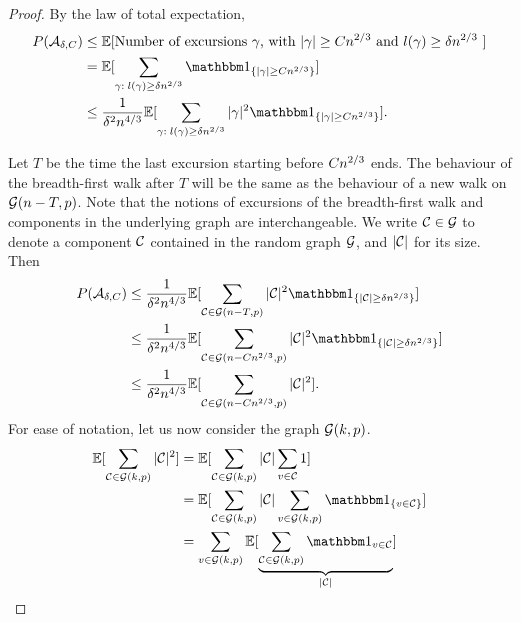\begin{proof}
	By the law of total expectation,
	\begin{align*}
	P(\ExcursionEvent) 
	&\leq \Exp{ \text{Number of excursions $\gamma$, with $|\gamma| \geq C\n{2}{3}$ and $l(\gamma) \geq \delta\n{2}{3}$ } } \\
	&= \Exp{ \sum_{\gamma: \; l(\gamma) \geq \delta\n{2}{3}} \Ind{\{|\gamma| \geq C\n{2}{3} \} } } \\
	&\leq \frac{1}{\delta^2\n{4}{3}} \Exp{ \sum_{\gamma: \; l(\gamma) \geq \delta\n{2}{3}}  |\gamma|^2 \Ind{\{|\gamma| \geq C\n{2}{3} \} }}.
	\end{align*}
	
	Let $T$ be the time the last excursion starting before $Cn^{2 / 3}$ ends.
	The behaviour of the breadth-first walk after $T$ will be the same as the behaviour of a new walk on $\mathcal{G}(n-T,p)$.
	Note that the notions of excursions of the breadth-first walk and components in the underlying graph are interchangeable.
	We write $\mathcal{C} \in \mathcal{G}$ to denote a component $\mathcal{C}$ contained in the random graph $\mathcal{G}$,
	and $|\mathcal{C}|$ for its size.
	Then
	\begin{equation} \label{E: P(ExcEvent) 2}
	\begin{aligned}
	P(\ExcursionEvent) 
	&\leq \frac{1}{\delta^2\n{4}{3}} \Exp{ \sum_{\Ccal \in \Gcal(n-T, p)}  |\Ccal|^2 \Ind{\{|\Ccal| \geq \delta\n{2}{3} \} }} \\
	&\leq \frac{1}{\delta^2\n{4}{3}} \Exp{ \sum_{\Ccal \in \Gcal(n-C\n{2}{3}, p)}  |\Ccal|^2 \Ind{\{|\Ccal| \geq \delta\n{2}{3} \} }} \\
	&\leq \frac{1}{\delta^2\n{4}{3}} \Exp{ \sum_{\Ccal \in \Gcal(n-C\n{2}{3}, p)}  |\Ccal|^2 }.
	\end{aligned}
	\end{equation}
	For ease of notation,
	let us now consider the graph $\mathcal{G}(k,p)$.
	\begin{equation} \label{E: P(ExcEvent) 3}
	\begin{aligned}
	\Exp{\sum_{\Ccal \in \Gcal(k, p)} |\Ccal|^2 } 
	&= \Exp{ \sum_{\Ccal \in \Gcal(k, p)} |\Ccal| \sum_{v \in \Ccal} 1} \\
	&= \Exp{ \sum_{\Ccal \in \Gcal(k, p)} |\Ccal| \sum_{v \in \Gcal(k,p)} \Ind{\{v \in \Ccal\}} } \\
	&= \sum_{v \in \Gcal(k,p)} \Exp{ \underbrace{\sum_{\Ccal \in \Gcal(k, p)} \Ind{v \in \Ccal}}_{|\Ccal|} } \\ 

\end{aligned}
\end{equation}
\end{proof}
